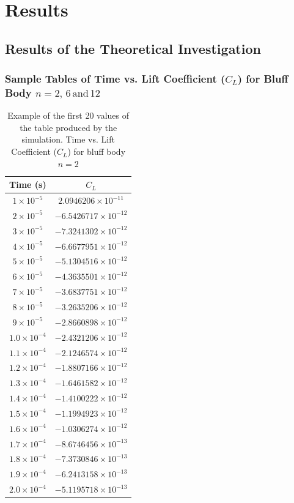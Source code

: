 \section{Results}
\subsection{Results of the Theoretical Investigation}

\subsubsection{Sample Tables of Time vs. Lift Coefficient ($C_L$) for Bluff Body $n=2,\,6\,\text{and}\,12$}

\begin{table}[H]
	\centering
	\begin{tabular}{|c|c|}
		\hline
		\textbf{Time (s)} & \textbf{$C_L$} \\
		\hline
		$1 \times 10^{-5}$ & $2.0946206 \times 10^{-11}$ \\
		\hline
		$2 \times 10^{-5}$ & $-6.5426717 \times 10^{-12}$ \\
		\hline
		$3 \times 10^{-5}$ & $-7.3241302 \times 10^{-12}$ \\
		\hline
		$4 \times 10^{-5}$ & $-6.6677951 \times 10^{-12}$ \\
		\hline
		$5 \times 10^{-5}$ & $-5.1304516 \times 10^{-12}$ \\
		\hline
		$6 \times 10^{-5}$ & $-4.3635501 \times 10^{-12}$ \\
		\hline
		$7 \times 10^{-5}$ & $-3.6837751 \times 10^{-12}$ \\
		\hline
		$8 \times 10^{-5}$ & $-3.2635206 \times 10^{-12}$ \\
		\hline
		$9 \times 10^{-5}$ & $-2.8660898 \times 10^{-12}$ \\
		\hline
		$1.0 \times 10^{-4}$ & $-2.4321206 \times 10^{-12}$ \\
		\hline
		$1.1 \times 10^{-4}$ & $-2.1246574 \times 10^{-12}$ \\
		\hline
		$1.2 \times 10^{-4}$ & $-1.8807166 \times 10^{-12}$ \\
		\hline
		$1.3 \times 10^{-4}$ & $-1.6461582 \times 10^{-12}$ \\
		\hline
		$1.4 \times 10^{-4}$ & $-1.4100222 \times 10^{-12}$ \\
		\hline
		$1.5 \times 10^{-4}$ & $-1.1994923 \times 10^{-12}$ \\
		\hline
		$1.6 \times 10^{-4}$ & $-1.0306274 \times 10^{-12}$ \\
		\hline
		$1.7 \times 10^{-4}$ & $-8.6746456 \times 10^{-13}$ \\
		\hline
		$1.8 \times 10^{-4}$ & $-7.3730846 \times 10^{-13}$ \\
		\hline
		$1.9 \times 10^{-4}$ & $-6.2413158 \times 10^{-13}$ \\
		\hline
		$2.0 \times 10^{-4}$ & $-5.1195718 \times 10^{-13}$ \\
		\hline
	\end{tabular}
	\label{tab:1FaceClTable}
	\caption{Example of the first 20 values of the table produced by the simulation. Time vs. Lift Coefficient ($C_L$) for bluff body $n=2$}
\end{table}

